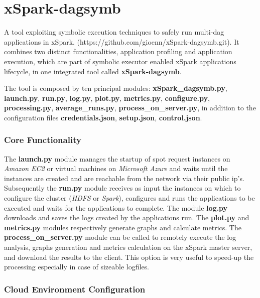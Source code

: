 \documentclass[
]{article}
\date{}
\begin{document}
\hypertarget{xspark-dagsymb}{%
\section{xSpark-dagsymb}\label{xspark-dagsymb}}

A tool exploiting symbolic execution techniques to safely run multi-dag
applications in xSpark. (https://github.com/gioenn/xSpark-dagsymb.git).
It combines two distinct functionalities, application profiling and
application execution, which are part of symbolic executor enabled
xSpark applications lifecycle, in one integrated tool called
\textbf{xSpark-dagsymb}.

The tool is composed by ten principal modules:
\textbf{xSpark\_dagsymb.py}, \textbf{launch.py}, \textbf{run.py},
\textbf{log.py}, \textbf{plot.py}, \textbf{metrics.py},
\textbf{configure.py}, \textbf{processing.py},
\textbf{average\_runs.py}, \textbf{process\_on\_server.py}, in addition
to the configuration files \textbf{credentials.json},
\textbf{setup.json}, \textbf{control.json}.

\hypertarget{core-functionality}{%
\subsubsection{Core Functionality}\label{core-functionality}}

The \textbf{launch.py} module manages the startup of spot request
instances on \emph{Amazon EC2} or virtual machines on \emph{Microsoft
Azure} and waits until the instances are created and are reachable from
the network via their public ip's. Subsequently the \textbf{run.py}
module receives as input the instances on which to configure the cluster
(\emph{HDFS} or \emph{Spark}), configures and runs the applications to
be executed and waits for the applications to complete. The module
\textbf{log.py} downloads and saves the logs created by the applications
run. The \textbf{plot.py} and \textbf{metrics.py} modules respectively
generate graphs and calculate metrics. The
\textbf{process\_on\_server.py} module can be called to remotely execute
the log analysis, graphs generation and metrics calculation on the
xSpark master server, and download the results to the client. This
option is very useful to speed-up the processing especially in case of
sizeable logfiles.

\hypertarget{cloud-environment-configuration}{%
\subsubsection{Cloud Environment
Configuration}\label{cloud-environment-configuration}}
\end{document}
